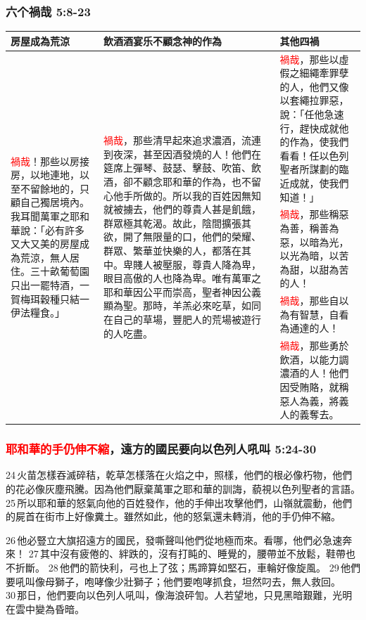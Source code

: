 \subsubsection{六个禍哉 5:8-23}
\begin{table}[H]
\centering 
\begin{tabular}{p{}|p{7.55cm}|p{6.5cm}}\hline\hline
房屋成為荒涼&飲酒酒宴乐不顧念神的作為&其他四禍\\\hline
\multirow{4}{3.1cm}{\textcolor{red}{禍哉}！那些以房接房，以地連地，以至不留餘地的，只顧自己獨居境內。我耳聞萬軍之耶和華說：「必有許多又大又美的房屋成為荒涼，無人居住。三十畝葡萄園只出一罷特酒，一賀梅珥穀種只結一伊法糧食。」} 
&\multirow{4}{7.51cm}{\textcolor{red}{禍哉}，那些清早起來追求濃酒，流連到夜深，甚至因酒發燒的人！他們在筵席上彈琴、鼓瑟、擊鼓、吹笛、飲酒，卻不顧念耶和華的作為，也不留心他手所做的。所以我的百姓因無知就被擄去，他們的尊貴人甚是飢餓，群眾極其乾渴。故此，陰間擴張其欲，開了無限量的口，他們的榮耀、群眾、繁華並快樂的人，都落在其中。卑賤人被壓服，尊貴人降為卑，眼目高傲的人也降為卑。唯有萬軍之耶和華因公平而崇高，聖者神因公義顯為聖。那時，羊羔必來吃草，如同在自己的草場，豐肥人的荒場被遊行的人吃盡。} 
&\textcolor{red}{禍哉}，那些以虛假之細繩牽罪孽的人，他們又像以套繩拉罪惡，說：「任他急速行，趕快成就他的作為，使我們看看！任以色列聖者所謀劃的臨近成就，使我們知道！」\\\cline{3-3}
&&\textcolor{red}{禍哉}，那些稱惡為善，稱善為惡，以暗為光，以光為暗，以苦為甜，以甜為苦的人！\\\cline{3-3}
&&\textcolor{red}{禍哉}，那些自以為有智慧，自看為通達的人！\\\cline{3-3}
&&\textcolor{red}{禍哉}，那些勇於飲酒，以能力調濃酒的人！他們因受賄賂，就稱惡人為義，將義人的義奪去。\\\hline
\end{tabular}
\end{table}

\subsubsection{\textcolor{red}{耶和華的手仍伸不縮}，遠方的國民要向以色列人吼叫 5:24-30}
24 火苗怎樣吞滅碎秸，乾草怎樣落在火焰之中，照樣，他們的根必像朽物，他們的花必像灰塵飛騰。因為他們厭棄萬軍之耶和華的訓誨，藐視以色列聖者的言語。 25 所以耶和華的怒氣向他的百姓發作，他的手伸出攻擊他們，山嶺就震動，他們的屍首在街市上好像糞土。雖然如此，他的怒氣還未轉消，他的手仍伸不縮。

26 他必豎立大旗招遠方的國民，發嘶聲叫他們從地極而來。看哪，他們必急速奔來！ 27 其中沒有疲倦的、絆跌的，沒有打盹的、睡覺的，腰帶並不放鬆，鞋帶也不折斷。 28 他們的箭快利，弓也上了弦；馬蹄算如堅石，車輪好像旋風。 29 他們要吼叫像母獅子，咆哮像少壯獅子；他們要咆哮抓食，坦然叼去，無人救回。 30 那日，他們要向以色列人吼叫，像海浪砰訇。人若望地，只見黑暗艱難，光明在雲中變為昏暗。

